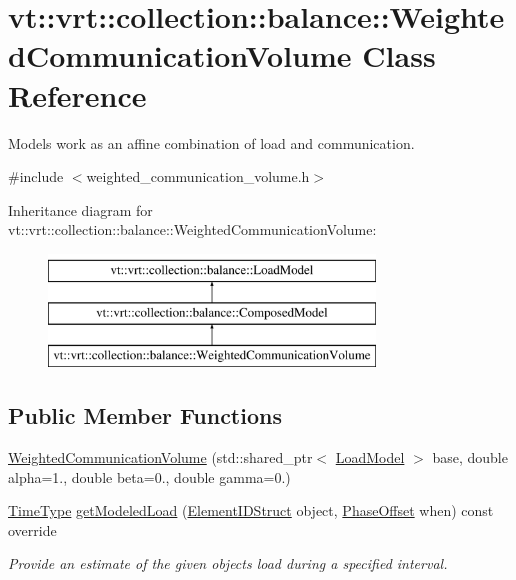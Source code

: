\hypertarget{classvt_1_1vrt_1_1collection_1_1balance_1_1_weighted_communication_volume}{}\section{vt\+:\+:vrt\+:\+:collection\+:\+:balance\+:\+:Weighted\+Communication\+Volume Class Reference}
\label{classvt_1_1vrt_1_1collection_1_1balance_1_1_weighted_communication_volume}


Models work as an affine combination of load and communication.  




{\ttfamily \#include $<$weighted\+\_\+communication\+\_\+volume.\+h$>$}

Inheritance diagram for vt\+:\+:vrt\+:\+:collection\+:\+:balance\+:\+:Weighted\+Communication\+Volume\+:\begin{figure}[H]
\begin{center}
\leavevmode
\includegraphics[height=3.000000cm]{classvt_1_1vrt_1_1collection_1_1balance_1_1_weighted_communication_volume}
\end{center}
\end{figure}
\subsection*{Public Member Functions}
\begin{DoxyCompactItemize}
\item 
\hyperlink{classvt_1_1vrt_1_1collection_1_1balance_1_1_weighted_communication_volume_a168729402b8779925cdfcbc8e67b15bb}{Weighted\+Communication\+Volume} (std\+::shared\+\_\+ptr$<$ \hyperlink{structvt_1_1vrt_1_1collection_1_1balance_1_1_load_model}{Load\+Model} $>$ base, double alpha=1., double beta=0., double gamma=0.)
\item 
\hyperlink{namespacevt_a876a9d0cd5a952859c72de8a46881442}{Time\+Type} \hyperlink{classvt_1_1vrt_1_1collection_1_1balance_1_1_weighted_communication_volume_a37c97a69e9e4bc8a80b2394d9bffb41e}{get\+Modeled\+Load} (\hyperlink{namespacevt_1_1vrt_1_1collection_1_1balance_a9f5b53fafb270212279a4757d2c4cd28}{Element\+I\+D\+Struct} object, \hyperlink{structvt_1_1vrt_1_1collection_1_1balance_1_1_phase_offset}{Phase\+Offset} when) const override
\begin{DoxyCompactList}\small\item\em Provide an estimate of the given object\textquotesingle{}s load during a specified interval. \end{DoxyCompactList}\end{DoxyCompactItemize}
